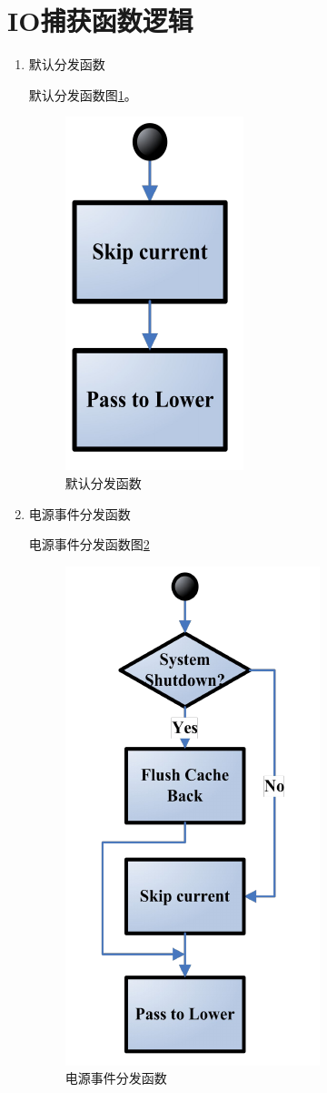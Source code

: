 
\section{IO捕获函数逻辑}
\label{sec:capture_io_logic}

\begin{enumerate}

\item 默认分发函数

默认分发函数图\ref{fig:df-default}。

\begin{figure}[h]
\centering
\includegraphics[width=0.2\linewidth]{./graph/df-default}
\caption{默认分发函数}
\label{fig:df-default}
\end{figure}

\item 电源事件分发函数

电源事件分发函数图\ref{fig:df-power}

\begin{figure}[h]
\centering
\includegraphics[width=0.3\linewidth]{./graph/df-power}
\caption{电源事件分发函数}
\label{fig:df-power}
\end{figure}


\end{enumerate}
